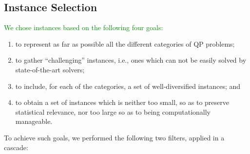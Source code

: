 \subsection{Instance Selection}\label{subsec:selection}

\textcolor{green}{We chose instances based on the following four goals:}
%
\begin{enumerate}
 \item to represent as far as possible all the different categories of QP
       problems;
 \item to gather ``challenging'' instances, i.e., ones which can not be easily
       solved by  state-of-the-art solvers;
 \item to include, for each of the categories, a set of well-diversified
       instances; and
 \item to obtain a set of instances which is neither too small, so as to
       preserve statistical relevance, nor too large so as to being
       computationally manageable.
\end{enumerate}
%
To achieve such goals, we performed the following two filters, applied in
a cascade:
%
